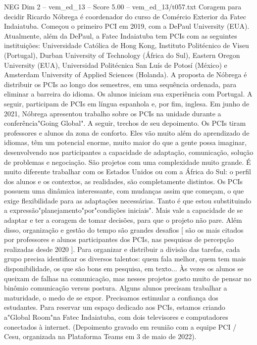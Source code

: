 \begin{textsample}{NEG Dim 2 – vem\_ed\_13 – Score 5.00 – vem\_ed\_13/t057.txt}  \label{ex:f2_neg_112}
Coragem para decidir Ricardo Nóbrega é coordenador do curso de Comércio Exterior da Fatec Indaiatuba.
Começou o primeiro PCI em 2019, com a DePaul University (EUA).
Atualmente, além da DePaul, a Fatec Indaiatuba tem PCIs com as seguintes instituições: Universidade Católica de Hong Kong, Instituto Politécnico de Viseu (Portugal), Durban University of Technology (África do Sul), Eastern Oregon University (EUA), Universidad Politécnica San Luís de Potosí (México) e Amsterdam University of Applied Sciences (Holanda).
A proposta de Nóbrega é distribuir os PCIs ao longo dos semestres, em uma sequência ordenada, para eliminar a barreira do idioma.
Os alunos iniciam sua experiência com Portugal.
A seguir, participam de PCIs em língua espanhola e, por fim, inglesa.
Em junho de 2021, Nóbrega apresentou trabalho sobre os PCIs na unidade durante a conferência"Going Global".
A seguir, trechos de seu depoimento.
Os PCIs tiram professores e alunos da zona de conforto.
Eles vão muito além do aprendizado de idiomas, têm um potencial enorme, muito maior do que a gente possa imaginar, desenvolvendo nos participantes a capacidade de adaptação, comunicação, solução de problemas e negociação.
São projetos com uma complexidade muito grande.
É muito diferente trabalhar com os Estados Unidos ou com a África do Sul: o perfil dos alunos e os contextos, as realidades, são completamente distintos.
Os PCIs possuem uma dinâmica interessante, com mudanças assim que começam, o que exige flexibilidade para as adaptações necessárias.
Tanto é que estou substituindo a expressão"planejamento"por"condições iniciais".
Mais vale a capacidade de se adaptar e ter a coragem de tomar decisões, para que o projeto não pare.
Além disso, organização e gestão do tempo são grandes desafios [ são os mais citados por professores e alunos participantes dos PCIs, nas pesquisas de percepção realizadas desde 2020 ].
Para organizar e distribuir a divisão das tarefas, cada grupo precisa identificar os diversos talentos: quem fala melhor, quem tem mais disponibilidade, os que são bons em pesquisa, em texto... Às vezes os alunos se queixam de falhas na comunicação, mas nesses projetos gosto muito de pensar no binômio comunicação versus postura.
Alguns alunos precisam trabalhar a maturidade, o medo de se expor.
Precisamos estimular a confiança dos estudantes.
Para reservar um espaço dedicado aos PCIs, estamos criando a"Global Room"na Fatec Indaiatuba, com dois televisores e computadores conectados à internet. (Depoimento gravado em reunião com a equipe PCI / Cesu, organizada na Plataforma Teams em 3 de maio de 2022).

\end{textsample}
